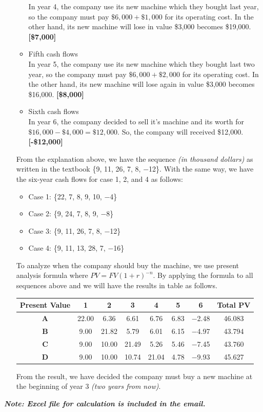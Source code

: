 \documentclass{article}
\begin{document}
\begin{enumerate}
\begin{itemize}
			In year 4, the company use its new machine which they bought last year, so the company must pay $\$6,000+\$1,000$ for its operating cost. In the other hand, its new machine will lose in value \$3,000 becomes \$19,000. \textbf{[\$7,000]}
			\item Fifth cash flows\\
			In year 5, the company use its new machine which they bought last two year, so the company must pay $\$6,000+\$2,000$ for its operating cost. In the other hand, its new machine will lose again in value \$3,000 becomes \$16,000. \textbf{[\$8,000]}
			\item Sixth cash flows\\
			In year 6, the company decided to sell it's machine and its worth for $\$16,000-\$4,000=\$12,000$. So, the company will received \$12,000. \textbf{[-\$12,000]}
		\end{itemize}
	From the explanation above, we have the sequence \textit{(in thousand dollars)} as written in the textbook \{9, 11, 26, 7, 8, $-$12\}. With the same way, we have the six-year cash flows for case 1, 2, and 4 as follows:\vspace{-0.5cm}\\
	\begin{itemize}
		\item Case 1: \{22, 7, 8, 9, 10, $-$4\}
		\item Case 2: \{9, 24, 7, 8, 9, $-$8\}
		\item Case 3: \{9, 11, 26, 7, 8, $-$12\}
		\item Case 4: \{9, 11, 13, 28, 7, $-$16\}
	\end{itemize}
	To analyze when the company should buy the machine, we use present analysis formula where $PV=FV(1+r)^{-n}$. By applying the formula to all sequences above and we will have the results in table as follows.\vspace{-0.5cm}
	\begin{center}
		\begin{tabular}{|c|c|c|c|c|c|c|c|}
			\hline
			\textbf{Present Value }&\textbf{1}&\textbf{2}&\textbf{3}&\textbf{4}&\textbf{5}&\textbf{6}&\textbf{Total PV}\\\hline
			\textbf{A}&22.00&6.36&6.61&6.76&6.83&$-$2.48&46.083\\\hline
			\textbf{B}&9.00&21.82&5.79&6.01&6.15&$-$4.97&43.794\\\hline
			\textbf{C}&9.00&10.00&21.49&5.26&5.46&$-$7.45&43.760\\\hline
			\textbf{D}&9.00&10.00&10.74&21.04&4.78&$-$9.93&45.627\\\hline
		\end{tabular}
	\end{center}
	From the result, we have decided the company must buy a new machine at the beginning of year 3 \textit{(two years from now)}.
	\end{enumerate}
	\vspace{10cm}
	\textit{\textbf{Note: Excel file for calculation is included in the email.}}
\end{document}
